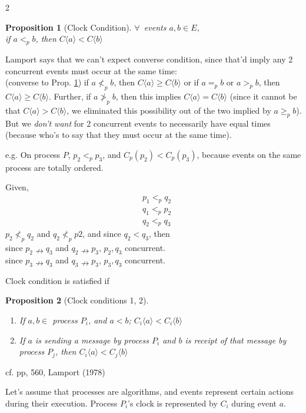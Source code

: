 \documentclass[10pt]{amsart}
\newtheorem{proposition}{Proposition}
\begin{document}
\begin{multicols*}{2}
\begin{proposition}[Clock Condition]\label{Prop:ClockCondition}
	$\forall \, $ events $a,b \in E$, \\if $a <_p b$, then $C\langle a \rangle < C \langle b \rangle$
\end{proposition}

Lamport says that we can't expect converse condition, since that'd imply any 2 concurrent events must occur at the same time: \\
(converse to Prop. \ref{Prop:ClockCondition}) if $a \not<_p b$, then $C\langle a \rangle \geq C\langle b \rangle$ or if $a =_p b$ or $a >_p b$, then $C\langle a \rangle \geq C\langle b\rangle$. Further, if $a \not>_p b$, then this implies $C\langle a \rangle = C\langle b \rangle$ (since it cannot be that $C\langle a \rangle > C\langle b \rangle$, we eliminated this possibility out of the two implied by $a \geq_p b$). But we \emph{don't want} for 2 concurrent events to necessarily have equal times (because  who's to say that they must occur at the same time).

e.g. On process $P$, $p_2 <_p p_3$, and $C_p(p_2) < C_p(p_3)$, because events on the same process are totally ordered.

Given,
\[
\begin{aligned}
& p_1 <_p q_2 \\
& q_1 <_p p_2 \\
& q_2 <_p q_3
\end{aligned}
\]
$p_2 \not<_p q_2$ and $q_2 \not<_p p2$, and since $q_2 < q_3$, then \\
since $p_2 \nrightarrow q_3$ and $q_2 \nrightarrow p_3$, $p_2, q_3$ concurrent. \\
since $p_3 \nrightarrow q_3$ and $q_3 \nrightarrow p_3$, $p_3, q_3$ concurrent.

Clock condition is satisfied if  
\begin{proposition}[Clock conditions 1, 2] 
\begin{enumerate}
	\item[C1] If $a,b \in $ process $P_i$, and $a<b$; $C_i\langle a \rangle < C_i \langle b \rangle$ 
	\item[C2] If $a$ is sending a message by process $P_i$ and $b$ is receipt of that message by process $P_j$, then $C_i\langle a \rangle < C_j \langle b \rangle$
\end{enumerate}
\end{proposition} 
cf. pp, 560, Lamport (1978) \cite{Lamp1978}

Let's assume that processes are algorithms, and events represent certain actions during their execution. Process $P_i$'s clock is represented by $C_i$ during event $a$. 


\end{multicols*}
\end{document}
